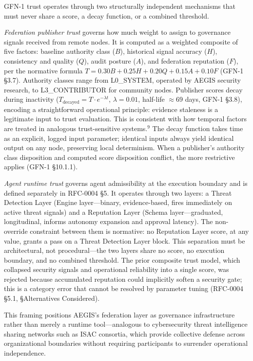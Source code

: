\documentclass{IEEEcsmag}
\begin{document}
GFN-1 trust operates through two structurally independent mechanisms that must never share a score, a decay function, or a combined threshold.

{\it Federation publisher trust} governs how much weight to assign to governance signals received from remote nodes. It is computed as a weighted composite of five factors: baseline authority class ($B$), historical signal accuracy ($H$), consistency and quality ($Q$), audit posture ($A$), and federation reputation ($F$), per the normative formula $T = 0.30B + 0.25H + 0.20Q + 0.15A + 0.10F$ (GFN-1 \S3.7). Authority classes range from L0\_SYSTEM, operated by AEGIS security research, to L3\_CONTRIBUTOR for community nodes. Publisher scores decay during inactivity ($T_{\text{decayed}} = T \cdot e^{-\lambda t}$, $\lambda=0.01$, half-life $\approx$69 days, GFN-1 \S3.8), encoding a straightforward operational principle: evidence staleness is a legitimate input to trust evaluation. This is consistent with how temporal factors are treated in analogous trust-sensitive systems.$^{9}$ The decay function takes time as an explicit, logged input parameter; identical inputs always yield identical output on any node, preserving local determinism. When a publisher's authority class disposition and computed score disposition conflict, the more restrictive applies (GFN-1 \S10.1.1).

{\it Agent runtime trust} governs agent admissibility at the execution boundary and is defined separately in RFC-0004 \S5. It operates through two layers: a Threat Detection Layer (Engine layer---binary, evidence-based, fires immediately on active threat signals) and a Reputation Layer (Schema layer---graduated, longitudinal, informs autonomy expansion and approval latency). The non-override constraint between them is normative: no Reputation Layer score, at any value, grants a pass on a Threat Detection Layer block. This separation must be architectural, not procedural---the two layers share no score, no execution boundary, and no combined threshold. The prior composite trust model, which collapsed security signals and operational reliability into a single score, was rejected because accumulated reputation could implicitly soften a security gate; this is a category error that cannot be resolved by parameter tuning (RFC-0004 \S5.1, \S Alternatives Considered).

This framing positions AEGIS's federation layer as governance infrastructure rather than merely a runtime tool---analogous to cybersecurity threat intelligence sharing networks such as ISAC consortia, which provide collective defense across organizational boundaries without requiring participants to surrender operational independence.
\end{document}
